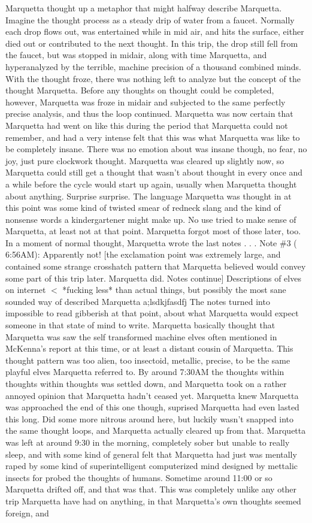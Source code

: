 \documentclass[12pt]{book}
\begin{document}
Marquetta thought up a metaphor that might halfway describe Marquetta. Imagine the thought process as a steady drip of water from a faucet. Normally each drop flows out, was entertained while in mid air, and hits the surface, either died out or contributed to the next thought. In this trip, the drop still fell from the faucet, but was stopped in midair, along with time Marquetta, and hyperanalyzed by the terrible, machine precision of a thousand combined minds. With the thought froze, there was nothing left to analyze but the concept of the thought Marquetta. Before any thoughts on thought could be completed, however, Marquetta was froze in midair and subjected to the same perfectly precise analysis, and thus the loop continued. Marquetta was now certain that Marquetta had went on like this during the period that Marquetta could not remember, and had a very intense felt that this was what Marquetta was like to be completely insane. There was no emotion about was insane though, no fear, no joy, just pure clockwork thought. Marquetta was cleared up slightly now, so Marquetta could still get a thought that wasn't about thought in every once and a while before the cycle would start up again, usually when Marquetta thought about anything. Surprise surprise. The language Marquetta was thought in at this point was some kind of twisted smear of redneck slang and the kind of nonsense words a kindergartener might make up. No use tried to make sense of Marquetta, at least not at that point. Marquetta forgot most of those later, too. In a moment of normal thought, Marquetta wrote the last notes . . .  Note \#3 ( 6:56AM): Apparently not! [the exclamation point was extremely large, and contained some strange crosshatch pattern that Marquetta believed would convey some part of this trip later. Marquetta did. Notes continue] Descriptions of elves on internet $<$ *fucking less* than actual things, but possibly the most sane sounded way of described Marquetta a;lsdkjfasdfj The notes turned into impossible to read gibberish at that point, about what Marquetta would expect someone in that state of mind to write. Marquetta basically thought that Marquetta was saw the self transformed machine elves often mentioned in McKenna's report at this time, or at least a distant cousin of Marquetta. This thought pattern was too alien, too insectoid, metallic, precise, to be the same playful elves Marquetta referred to. By around 7:30AM the thoughts within thoughts within thoughts was settled down, and Marquetta took on a rather annoyed opinion that Marquetta hadn't ceased yet. Marquetta knew Marquetta was approached the end of this one though, suprised Marquetta had even lasted this long. Did some more nitrous around here, but luckily wasn't snapped into the same thought loops, and Marquetta actually cleared up from that. Marquetta was left at around 9:30 in the morning, completely sober but unable to really sleep, and with some kind of general felt that Marquetta had just was mentally raped by some kind of superintelligent computerized mind designed by mettalic insects for probed the thoughts of humans. Sometime around 11:00 or so Marquetta drifted off, and that was that. This was completely unlike any other trip Marquetta have had on anything, in that Marquetta's own thoughts seemed foreign, and 
\end{document}
